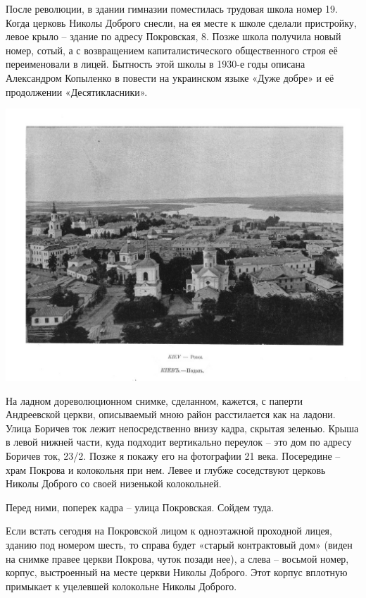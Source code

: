 После революции, в здании гимназии поместилась трудовая школа номер 19. Когда церковь Николы Доброго снесли, на ея месте к школе сделали пристройку, левое крыло – здание по адресу Покровская, 8. Позже школа получила новый номер, сотый, а с возвращением капиталистического общественного строя её переименовали в лицей. Бытность этой школы в 1930-е годы описана Александром Копыленко в повести на украинском языке «Дуже добре» и её продолжении «Десятикласники».

\begin{center}
\includegraphics[width=\linewidth]{chast-colebanie-osnov/borichev-tok/podol-panorama.jpg}
\end{center}

На ладном дореволюционном снимке, сделанном, кажется, с паперти Андреевской церкви, описываемый мною район расстилается как на ладони. Улица Боричев ток лежит непосредственно внизу кадра, скрытая зеленью. Крыша в левой нижней части, куда подходит вертикально переулок – это дом по адресу Боричев ток, 23/2. Позже я покажу его на фотографии 21 века. Посередине – храм Покрова и колокольня при нем. Левее и глубже соседствуют церковь Николы Доброго со своей низенькой колокольней.

Перед ними, поперек кадра – улица Покровская. Сойдем туда.

Если встать сегодня на Покровской лицом к одноэтажной проходной лицея, зданию под номером шесть, то справа будет «старый контрактовый дом» (виден на снимке правее церкви Покрова, чуток позади нее), а слева – восьмой номер, корпус, выстроенный на месте церкви Николы Доброго. Этот корпус вплотную примыкает к уцелевшей колокольне Николы Доброго. 

